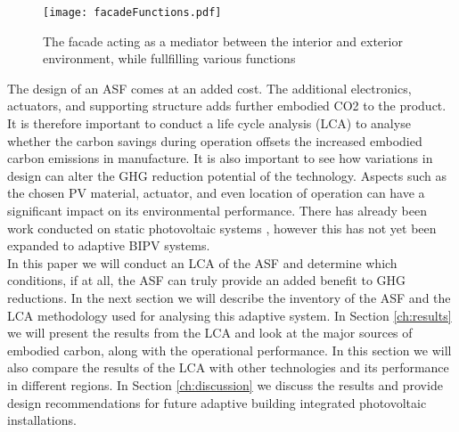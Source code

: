 \begin{figure}[H]
\begin{center}
\texttt{[image: facadeFunctions.pdf]}
\caption{The facade acting as a mediator between the interior and exterior environment, while fullfilling various functions \cite{nagy2015frontiers}}
\label{fig:ASFschematic}
\end{center}
\end{figure}

The design of an ASF comes at an added cost. The additional electronics, actuators, and supporting structure adds further embodied CO2 to the product. It is therefore important to conduct a life cycle analysis (LCA) to analyse whether the carbon savings during operation offsets the increased embodied carbon emissions in manufacture. It is also important to see how variations in design can alter the GHG reduction potential of the technology. Aspects such as the chosen PV material, actuator, and even location of operation can have a significant impact on its environmental performance. There has already been work conducted on static photovoltaic systems \cite{raugei2007life}, however this has not yet been expanded to adaptive BIPV systems. \\

In this paper we will conduct an LCA of the ASF and determine which conditions, if at all, the ASF can truly provide an added benefit to GHG reductions. In the next section we will describe the inventory of the ASF and the LCA methodology used for analysing this adaptive system. In Section \ref{ch:results} we will present the results from the LCA and look at the major sources of embodied carbon, along with the operational performance. In this section we will also compare the results of the LCA with other technologies and its performance in different regions. In Section \ref{ch:discussion} we discuss the results and provide design recommendations for future adaptive building integrated photovoltaic installations. 












